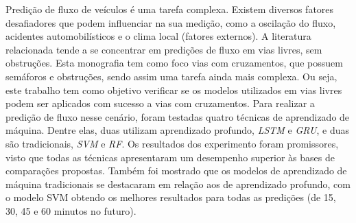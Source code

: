 Predição de fluxo de veículos é uma tarefa complexa. Existem diversos fatores desafiadores que podem influenciar na sua medição, como a oscilação do fluxo, acidentes automobilísticos e o clima local (fatores externos). A literatura relacionada tende a se concentrar em predições de fluxo em vias livres, sem obstruções. Esta monografia tem como foco vias com cruzamentos, que possuem semáforos e obstruções, sendo assim uma tarefa ainda mais complexa. Ou seja, este trabalho tem como objetivo verificar se os modelos utilizados em vias livres podem ser aplicados com sucesso a vias com cruzamentos.  Para realizar a predição de fluxo nesse cenário, foram testadas quatro técnicas de aprendizado de máquina. Dentre elas, duas utilizam aprendizado profundo, \textit{\acrfull{LSTM}} e \textit{\acrfull{GRU}}, e duas são tradicionais, \textit{\acrfull{SVM}} e \textit{\acrfull{RF}}. Os resultados dos experimento foram promissores, visto que todas as técnicas apresentaram um desempenho superior às bases de comparações propostas. Também foi mostrado que os modelos de aprendizado de máquina tradicionais se destacaram em relação aos de aprendizado profundo, com o modelo \acrshort{SVM} obtendo os melhores resultados para todas as predições (de 15, 30, 45 e 60 minutos no futuro).

